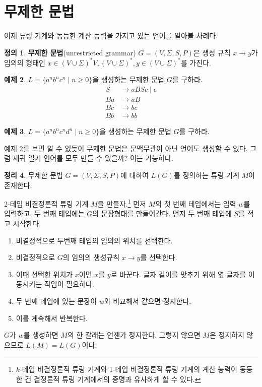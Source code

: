 \documentclass[b5paper, 11pt]{book}
\theoremstyle{definition}
\newtheorem{defn}{정의}[chapter]
\newtheorem{thm}[defn]{정리}
\newtheorem{ex}[defn]{예제}
\newenvironment{pf*}{\pushQED{\qed}\pf}
{\popQED\endpf}
\begin{document}
\section{무제한 문법}
이제 튜링 기계와 동등한 계산 능력을 가지고 있는 언어를 알아볼 차례다. 
\begin{defn}
    \textbf{무제한 문법}(unrestricted grammar) $G = (V, \Sigma , S, P)$은 생성 규칙 $x \rightarrow y$가 임의의 형태인 $x \in (V \cup \Sigma)^* V, (V \cup \Sigma)^*, y \in (V \cup \Sigma)^*$를 가진다.
\end{defn}
\begin{ex} \label{UG_ex}
    $L = \{a^n b^n c^n \;\vert\; n \ge 0\}$을 생성하는 무제한 문법 $G$를 구하라.
    \begin{align*}
        S &\rightarrow aBSc \;\vert\; \epsilon \\ 
        Ba &\rightarrow aB \\ 
        Bc &\rightarrow bc \\ 
        Bb &\rightarrow bb 
    \end{align*}
\end{ex}
\begin{ex}
    $L = \{a^n b^n c^n d^n \;\vert\; n \ge 0\}$을 생성하는 무제한 문법 $G$를 구하라.
\end{ex}
예제 \ref{UG_ex}를 보면 알 수 있듯이 무제한 문법은 문맥무관이 아닌 언어도 생성할 수 있다. 그럼 재귀 열거 언어를 모두 만들 수 있을까? 이는 가능하다.
\begin{thm}
    무제한 문법 $G = (V, \Sigma, S, P)$에 대하여 $L(G)$를 정의하는 튜링 기계 $M$이 존재한다.
\end{thm}
\begin{pf*}
    2-테입 비결정론적 튜링 기계 $M$을 만들자.\footnote{$k$-테입 비결정론적 튜링 기계와 1-테입 비결정론적 튜링 기계의 계산 능력이 동등한 건 결정론적 튜링 기계에서의 증명과 유사하게 할 수 있다.} 먼저 $M$의 첫 번째 테입에서는 입력 $w$를 입력하고, 두 번째 테입에는 $G$의 문장형태를 만들어간다. 먼저 두 번째 테입에 $S$를 적고 시작한다.
    \begin{enumerate}
        \item 비결정적으로 두번째 테입의 임의의 위치를 선택한다.
        \item 비결정적으로 $G$의 임의의 생성규칙 $x \rightarrow y$를 선택한다.
        \item 이때 선택한 위치가 $x$이면 $x$를 $y$로 바꾼다. 글자 길이를 맞추기 위해 옆 글자를 이동시키는 작업이 필요하다.
        \item 두 번째 테입에 있는 문장이 $w$와 비교해서 같으면 정지한다.
        \item 이를 계속해서 반복한다.
    \end{enumerate}
    $G$가 $w$를 생성하면 $M$의 한 갈래는 언젠가 정지한다. 그렇지 않으면 $M$은 정지하지 않으므로 $L(M) = L(G)$이다.
\end{pf*}
\end{document}
